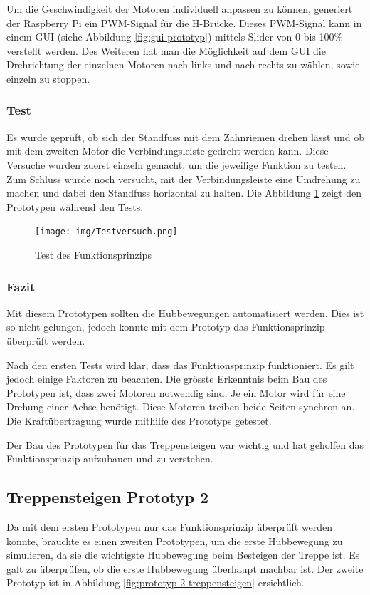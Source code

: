 \newpage

Um die Geschwindigkeit der Motoren individuell anpassen zu können, generiert der Raspberry Pi ein PWM-Signal für die H-Brücke. Dieses PWM-Signal kann in einem GUI (siehe Abbildung \ref{fig:gui-prototyp}) mittels Slider von 0 bis 100\% verstellt werden. 
Des Weiteren hat man die Möglichkeit auf dem GUI die Drehrichtung der einzelnen Motoren nach links und nach rechts zu wählen, sowie einzeln zu stoppen.

\subsubsection{Test}
Es wurde geprüft, ob sich der Standfuss mit dem Zahnriemen drehen lässt und ob mit dem zweiten Motor die Verbindungsleiste gedreht werden kann. Diese Versuche wurden zuerst einzeln gemacht, um die jeweilige Funktion zu testen. Zum Schluss wurde noch versucht, mit der Verbindungsleiste eine Umdrehung zu machen und dabei den Standfuss horizontal zu halten. Die Abbildung \ref{fig:test-prototyp-treppensteigen} zeigt den Prototypen während den Tests.

\begin{figure}[H]
  \texttt{[image: img/Testversuch.png]}
  \centering
  \caption{Test des Funktionsprinzips}
  \label{fig:test-prototyp-treppensteigen}
\end{figure}

\subsubsection{Fazit}
Mit diesem Prototypen sollten die Hubbewegungen automatisiert werden. Dies ist so nicht gelungen, jedoch konnte mit dem Prototyp das Funktionsprinzip überprüft werden.

Nach den ersten Tests wird klar, dass das Funktionsprinzip funktioniert. Es gilt jedoch einige Faktoren zu beachten. Die grösste Erkenntnis beim Bau des Prototypen ist, dass zwei Motoren notwendig sind. Je ein Motor wird für eine Drehung einer Achse benötigt. Diese Motoren treiben beide Seiten synchron an. Die Kraftübertragung wurde mithilfe des Prototyps getestet.

Der Bau des Prototypen für das Treppensteigen war wichtig und hat geholfen das Funktionsprinzip aufzubauen und zu verstehen.

\newpage

\subsection{Treppensteigen Prototyp 2}
Da mit dem ersten Prototypen nur das Funktionsprinzip überprüft werden konnte, brauchte es einen zweiten Prototypen, um die erste Hubbewegung zu simulieren, da sie die wichtigste Hubbewegung beim Besteigen der Treppe ist. Es galt zu überprüfen, ob die erste Hubbewegung überhaupt machbar ist. Der zweite Prototyp ist in Abbildung \ref{fig:prototyp-2-treppensteigen} ersichtlich.


